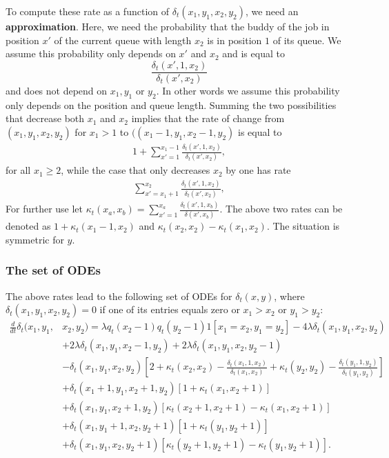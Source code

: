 \documentclass[acmsmall,nonacm]{acmart}
\begin{document}
To compute these rate as a function of $\delta_t(x_1,y_1,x_2,y_2)$, we need an \textbf{approximation}. Here, we need the probability that the buddy of the job in position $x'$ of the current queue with length $x_2$ is in position $1$ of its queue. We assume this probability
only depends on $x'$ and $x_2$ and is equal to 
\[\frac{\delta_t(x',1,x_2)}{\delta_t(x',x_2)}\] 
and does not depend on $x_1,y_1$ or $y_2$. In other words we assume this probability only depends on the
position and queue length. 
Summing the two possibilities that decrease both $x_1$ and $x_2$ implies that the rate
of change from $(x_1,y_1,x_2,y_2)$ for $x_1 > 1$ to $((x_1-1,y_1,x_2-1,y_2)$ is equal to 
\begin{align*}
    1+ \sum_{x' =1}^{x_1-1} \frac{\delta_t(x',1,x_2)}{\delta_t(x',x_2)},
\end{align*}
for all $x_1\ge2$, while the case that only decreases $x_2$ by one has rate
\begin{align*}
\sum_{x' =x_1+1}^{x_2} \frac{\delta_t(x',1,x_2)}{\delta_t(x',x_2)},
\end{align*}
For further use let 
$\kappa_t(x_a,x_b)= \sum_{x'=1}^{x_a} \frac{\delta_t(x',1,x_b)}{\delta(x',x_b)}$. 
The above two rates can be denoted as $1+\kappa_t(x_1-1,x_2)$ and
$\kappa_t(x_2,x_2)-\kappa_t(x_1,x_2)$.
The situation is symmetric for $y$. 



\subsubsection{The set of ODEs}
The above rates lead to the following set of ODEs for $\delta_t(x,y)$, where
$\delta_t(x_1,y_1,x_2,y_2)=0$ if one of its entries equals zero or $x_1 > x_2$ or $y_1 > y_2$:
\begin{align}\label{eq:ODEFCFS}
    \frac{d}{dt} \delta_t(x_1,y_1,&x_2,y_2)= \lambda q_t(x_2-1) q_t(y_2-1) 
    1[x_1=x_2, y_1=y_2]- 4\lambda \delta_t(x_1,y_1,x_2,y_2) \nonumber \\&+
    2\lambda\delta_t(x_1,y_1,x_2-1,y_2) + 2\lambda \delta_t(x_1,y_1,x_2,y_2-1) \nonumber\\
    &-\delta_t(x_1,y_1,x_2,y_2) 
    \left[2+ \kappa_t(x_2,x_2) - \frac{\delta_t(x_1,1,x_2)}{\delta_t(x_1,x_2)}
    + \kappa_t(y_2,y_2) - \frac{\delta_t(y_1,1,y_2)}{\delta_t(y_1,y_2)}\right] 
    \nonumber \\ 
    &+\delta_t(x_1+1,y_1,x_2+1,y_2) 
    \left[1+ \kappa_t(x_1,x_2+1) \right] \nonumber \\
    &+\delta_t(x_1,y_1,x_2+1,y_2) 
    \left[\kappa_t(x_2+1,x_2+1) -\kappa_t(x_1,x_2+1) \right] \nonumber \\
    & +\delta_t(x_1,y_1+1,x_2,y_2+1) 
    \left[1+ \kappa_t(y_1,y_2+1) \right] \nonumber \\
    &+\delta_t(x_1,y_1,x_2,y_2+1) 
    \left[\kappa_t(y_2+1,y_2+1) -\kappa_t(y_1,y_2+1) \right].
\end{align}
\end{document}
